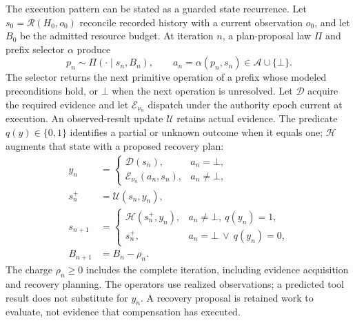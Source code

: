 The execution pattern can be stated as a guarded state recurrence. Let $s_0=\mathcal R(H_0,o_0)$ reconcile recorded history with a current observation $o_0$, and let $B_0$ be the admitted resource budget. At iteration $n$, a plan-proposal law $\Pi$ and prefix selector $\alpha$ produce
\begin{equation}
 p_n\sim\Pi(\cdot\mid s_n,B_n),\qquad
 a_n=\alpha(p_n,s_n)\in\mathcal A\cup\{\bot\}.
\label{eq:C10:plan-prefix}
\end{equation}
The selector returns the next primitive operation of a prefix whose modeled preconditions hold, or $\bot$ when the next operation is unresolved. Let $\mathcal D$ acquire the required evidence and let $\mathcal E_{\nu_n}$ dispatch under the authority epoch current at execution. An observed-result update $\mathcal U$ retains actual evidence. The predicate $q(y)\in\{0,1\}$ identifies a partial or unknown outcome when it equals one; $\mathcal H$ augments that state with a proposed recovery plan:
\begin{equation}
\begin{aligned}
 y_n&=
 \begin{cases}
 \mathcal D(s_n),&a_n=\bot,\\
 \mathcal E_{\nu_n}(a_n,s_n),&a_n\ne\bot,
 \end{cases}\\
 s_n^+&=\mathcal U(s_n,y_n),\\
 s_{n+1}&=
 \begin{cases}
 \mathcal H(s_n^+,y_n),&a_n\ne\bot,\ q(y_n)=1,\\
 s_n^+,&a_n=\bot\ \vee\ q(y_n)=0,
 \end{cases}\\
 B_{n+1}&=B_n-\rho_n.
\end{aligned}
\label{eq:C10:observed-transition}
\end{equation}
The charge $\rho_n\geq0$ includes the complete iteration, including evidence acquisition and recovery planning. The operators use realized observations; a predicted tool result does not substitute for $y_n$. A recovery proposal is retained work to evaluate, not evidence that compensation has executed.

